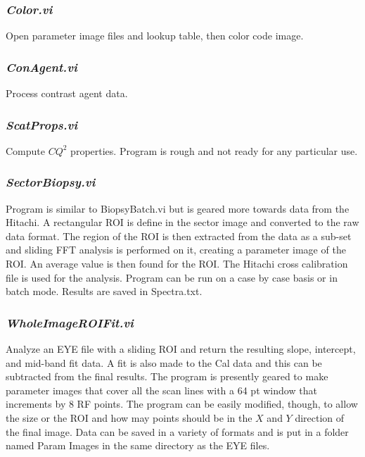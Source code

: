 \documentclass[10pt]{article}
\begin{document}
\subsubsection{{\it Color.vi}}

Open parameter image files and lookup table, then color code
image.

\subsubsection{{\it ConAgent.vi}}

Process contrast agent data.

\subsubsection{{\it ScatProps.vi}}

Compute $CQ^{2}$ properties. Program is rough and not ready for
any particular use.

\subsubsection{{\it SectorBiopsy.vi}}

Program is similar to BiopsyBatch.vi but is geared more towards
data from the Hitachi. A rectangular ROI is define in the sector
image and converted to the raw data format. The region of the ROI
is then extracted from the data as a sub-set and sliding FFT
analysis is performed on it, creating a parameter image of the
ROI. An average value is then found for the ROI. The Hitachi cross
calibration file is used for the analysis. Program can be run on a
case by case basis or in batch mode. Results are saved in
Spectra.txt.

\subsubsection{{\it WholeImageROIFit.vi}}

Analyze an EYE file with a sliding ROI and return the resulting
slope, intercept, and mid-band fit data. A fit is also made to the
Cal data and this can be subtracted from the final results. The
program  is presently geared to make parameter images that cover
all the scan lines with a 64 pt window that increments by 8 RF
points. The program can be easily modified, though, to allow the
size or the ROI and how may points should be in the $X$ and $Y$
direction of the final image. Data can be saved in a variety of
formats and is put in a folder named Param Images in the same
directory as the EYE files.
\end{document}
